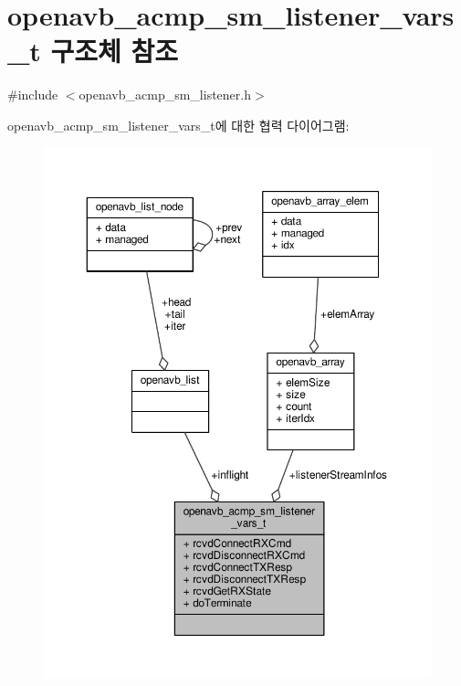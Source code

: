 \hypertarget{structopenavb__acmp__sm__listener__vars__t}{}\section{openavb\+\_\+acmp\+\_\+sm\+\_\+listener\+\_\+vars\+\_\+t 구조체 참조}
\label{structopenavb__acmp__sm__listener__vars__t}


{\ttfamily \#include $<$openavb\+\_\+acmp\+\_\+sm\+\_\+listener.\+h$>$}



openavb\+\_\+acmp\+\_\+sm\+\_\+listener\+\_\+vars\+\_\+t에 대한 협력 다이어그램\+:
\nopagebreak
\begin{figure}[H]
\begin{center}
\leavevmode
\includegraphics[width=350pt]{structopenavb__acmp__sm__listener__vars__t__coll__graph}
\end{center}
\end{figure}
